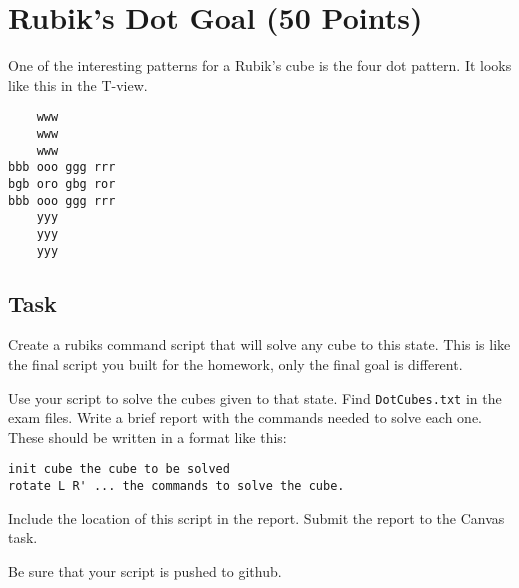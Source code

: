 \section*{Rubik's Dot Goal (50 Points)}

One of the interesting patterns for a Rubik's cube is the four dot pattern.
It looks like this in the T-view.

\begin{small}
\begin{verbatim}
    www
    www
    www
bbb ooo ggg rrr
bgb oro gbg ror
bbb ooo ggg rrr
    yyy
    yyy
    yyy
\end{verbatim}
\end{small}

\subsection*{Task}

Create a rubiks command script that will solve any cube
to this state.  This is like the final script you built
for the homework, only the final goal is different.

Use your script to solve the cubes given to that state.
Find \texttt{DotCubes.txt} in the exam files. 
Write a brief report with the commands needed to solve
each one.  These should be written in a format like this:

\begin{verbatim}
init cube the cube to be solved
rotate L R' ... the commands to solve the cube.
\end{verbatim}

Include the location of this script in the report.
Submit the report to the Canvas task.

Be sure that your script is pushed to github.
